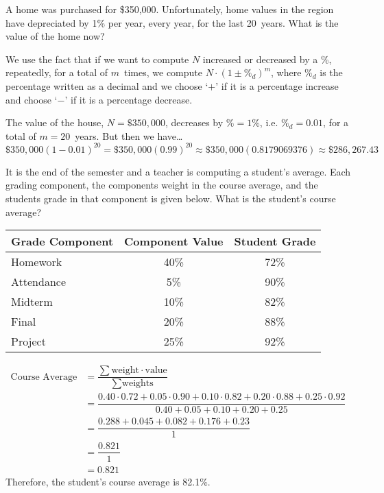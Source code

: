 \documentclass[12pt,letterpaper]{exam}
\begin{document}
\begin{questions}
\newpage
\question[10] A home was purchased for \$350,000. Unfortunately, home values in the region have depreciated by 1\% per year, every year, for the last 20~years. What is the value of the home now? \pspace

\sol We use the fact that if we want to compute $N$ increased or decreased by a \%, repeatedly, for a total of $m$~times, we compute $N \cdot (1 \pm \%_d)^m$, where $\%_d$ is the percentage written as a decimal and we choose `$+$' if it is a percentage increase and choose `$-$' if it is a percentage decrease. \pspace

The value of the house, $N= \$350,\!000$, decreases by $\%= 1\%$, i.e. $\%_d= 0.01$, for a total of $m= 20$~years. But then we have\dots
	\[
	\$350,\!000 (1 - 0.01)^{20}= \$350,\!000 (0.99)^{20} \approx \$350,\!000 (0.8179069376) \approx \$286,\!267.43
	\]



\newpage
\question[10] It is the end of the semester and a teacher is computing a student's average. Each grading component, the components weight in the course average, and the students grade in that component is given below. What is the student's course average? \par
	\begin{table}[H]
	\centering
	\begin{tabular}{lcc}
	Grade Component & Component Value & Student Grade \\ \hline
	Homework & 40\% & 72\% \\
	Attendance & \phantom{0}5\% & 90\% \\
	Midterm & 10\% & 82\% \\
	Final & 20\% & 88\% \\
	Project & 25\% & 92\%
	\end{tabular}
	\end{table} \pspace

\sol 
	\[
	\begin{aligned}
	\text{Course Average}&= \dfrac{\sum \text{weight} \cdot \text{value}}{\sum \text{weights}} \\[0.3cm]
	&= \dfrac{0.40 \cdot 0.72 + 0.05 \cdot 0.90 + 0.10 \cdot 0.82 + 0.20 \cdot 0.88 + 0.25 \cdot 0.92}{0.40 + 0.05 + 0.10 + 0.20 + 0.25} \\[0.3cm]
	&= \dfrac{0.288 + 0.045 + 0.082 + 0.176 + 0.23}{1} \\[0.3cm]
	&= \dfrac{0.821}{1} \\[0.3cm]
	&= 0.821
	\end{aligned}
	\] \pspace
Therefore, the student's course average is 82.1\%. 




\end{questions}
\end{document}

